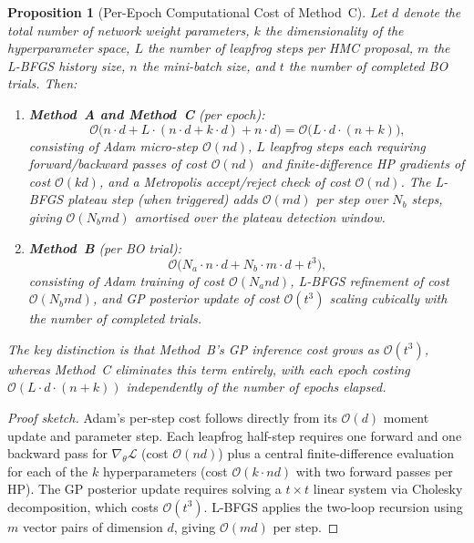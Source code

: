 \documentclass[12pt,a4paper]{article}
\newtheorem{proposition}{Proposition}
\begin{document}
\begin{proposition}[Per-Epoch Computational Cost of Method~C]
\label{prop:complexity}
Let $d$ denote the total number of network weight parameters,
$k$ the dimensionality of the hyperparameter space,
$L$ the number of leapfrog steps per HMC proposal,
$m$ the L-BFGS history size,
$n$ the mini-batch size,
and $t$ the number of completed BO trials.  Then:
\begin{enumerate}
\item \textbf{Method~A and Method~C} (per epoch):
\[
  \mathcal{O}\bigl(n \cdot d + L \cdot (n \cdot d + k \cdot d) + n \cdot d\bigr)
  = \mathcal{O}\bigl(L \cdot d \cdot (n + k)\bigr),
\]
consisting of Adam micro-step $\mathcal{O}(nd)$, $L$ leapfrog steps
each requiring forward/backward passes of cost $\mathcal{O}(nd)$ and
finite-difference HP gradients of cost $\mathcal{O}(kd)$, and a
Metropolis accept/reject check of cost $\mathcal{O}(nd)$.  The L-BFGS
plateau step (when triggered) adds $\mathcal{O}(md)$ per step over
$N_b$ steps, giving $\mathcal{O}(N_b m d)$ amortised over the plateau
detection window.
\item \textbf{Method~B} (per BO trial):
\[
  \mathcal{O}\bigl(N_a \cdot n \cdot d + N_b \cdot m \cdot d + t^3\bigr),
\]
consisting of Adam training of cost $\mathcal{O}(N_a n d)$, L-BFGS
refinement of cost $\mathcal{O}(N_b m d)$, and GP posterior update of
cost $\mathcal{O}(t^3)$ scaling \emph{cubically} with the number of
completed trials.
\end{enumerate}
The \emph{key distinction} is that Method~B's GP inference cost grows
as $\mathcal{O}(t^3)$, whereas Method~C eliminates this term entirely,
with each epoch costing $\mathcal{O}(L \cdot d \cdot (n + k))$
independently of the number of epochs elapsed.
\end{proposition}

\begin{proof}[Proof sketch]
Adam's per-step cost follows directly from its $\mathcal{O}(d)$
moment update and parameter step.  Each leapfrog half-step requires
one forward and one backward pass for $\nabla_\theta\mathcal{L}$
(cost $\mathcal{O}(nd)$) plus a central finite-difference evaluation
for each of the $k$ hyperparameters (cost $\mathcal{O}(k \cdot nd)$
with two forward passes per HP).  The GP posterior update requires
solving a $t \times t$ linear system via Cholesky decomposition, which
costs $\mathcal{O}(t^3)$.  L-BFGS applies the two-loop recursion
using $m$ vector pairs of dimension $d$, giving $\mathcal{O}(md)$
per step.
\end{proof}
\end{document}
